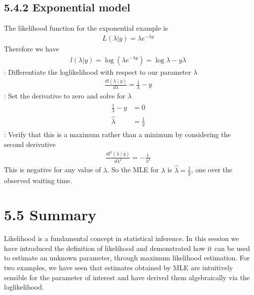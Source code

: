 \documentclass[letterpaper,10pt,english]{jupyterBook}
\begin{document}
\subsection{5.4.2 Exponential model}
\label{\detokenize{05.e. Likelihood:exponential-model}}
\sphinxAtStartPar
The likelihood function for the exponential example is
\begin{equation*}
\begin{split}
L(\lambda | y) = \lambda e^{-\lambda y}
\end{split}
\end{equation*}
\sphinxAtStartPar
Therefore we have
\begin{equation*}
\begin{split} 
l(\lambda | y) = \log \left( \lambda e^{-\lambda y} \right) = \log \lambda - y \lambda 
\end{split}
\end{equation*}
\sphinxAtStartPar
{}: Differentiate the log\sphinxhyphen{}likelihood with respect to our parameter \(\lambda\)
\begin{equation*}
\begin{split}
\frac{d l \left( \lambda \mid y \right)}{d \lambda} = \frac{1}{\lambda} - y
\end{split}
\end{equation*}
\sphinxAtStartPar
{}: Set the derivative to zero and solve for \(\lambda\)
\begin{equation*}
\begin{split} 
\begin{align*}
\frac{1}{\lambda} - y &= 0 \\
\hat{\lambda} & = \frac{1}{y} 
\end{align*}
\end{split}
\end{equation*}
\sphinxAtStartPar
{}: Verify that this is a maximum rather than a minimum by considering the second derivative
\begin{equation*}
\begin{split} 
\frac{d l^2 \left(\lambda \mid y \right)}{d \lambda ^2} = -\frac{1}{\lambda^2}
\end{split}
\end{equation*}
\sphinxAtStartPar
This is negative for any value of \(\lambda\). So the MLE for \(\lambda\) is \(\hat{\lambda} = \frac{1}{y}\), one over the observed waiting time.


\section{5.5 Summary}
\label{\detokenize{05.f. Likelihood:summary}}\label{\detokenize{05.f. Likelihood::doc}}
\sphinxAtStartPar
Likelihood is a fundamental concept in statistical inference. In this session we have introduced the definition of likelihood and demonstrated how it can be used to estimate an unknown parameter, through maximum likelihood estimation. For two examples, we have seen that estimates obtained by MLE are intuitively sensible for the parameter of interest and have derived them algebraically via the log\sphinxhyphen{}likelihood.
\end{document}
